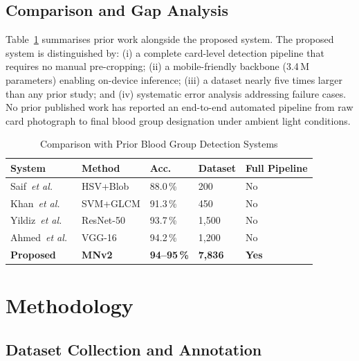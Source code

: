 \documentclass[journal]{IEEEtran}
\begin{document}
\subsection{Comparison and Gap Analysis}

Table~\ref{tab:comparison} summarises prior work alongside the
proposed system.
The proposed system is distinguished by: (i) a complete card-level
detection pipeline that requires no manual pre-cropping; (ii) a
mobile-friendly backbone (3.4\,M parameters) enabling on-device
inference; (iii) a dataset nearly five times larger than any prior
study; and (iv) systematic error analysis addressing failure cases.
No prior published work has reported an end-to-end automated pipeline
from raw card photograph to final blood group designation under
ambient light conditions.

\begin{table}[htbp]
  \caption{Comparison with Prior Blood Group Detection Systems}
  \label{tab:comparison}
  \centering
  \renewcommand{\arraystretch}{1.1}
  \begin{tabular}{lp{1.4cm}p{0.8cm}p{1.0cm}p{1.0cm}}
    \toprule
    \textbf{System} & \textbf{Method} & \textbf{Acc.} &
    \textbf{Dataset} & \textbf{Full Pipeline} \\
    \midrule
    Saif~\emph{et al.}~\cite{saif2016}    & HSV+Blob   & 88.0\,\% & 200    & No \\
    Khan~\emph{et al.}~\cite{khan2018}    & SVM+GLCM   & 91.3\,\% & 450    & No \\
    Yildiz~\emph{et al.}~\cite{yildiz2020}& ResNet-50  & 93.7\,\% & 1,500  & No \\
    Ahmed~\emph{et al.}~\cite{ahmed2021}  & VGG-16     & 94.2\,\% & 1,200  & No \\
    \textbf{Proposed}                     & \textbf{MNv2} & \textbf{94--95\,\%} & \textbf{7,836} & \textbf{Yes} \\
    \bottomrule
  \end{tabular}
\end{table}

\section{Methodology}
\label{sec:method}

\subsection{Dataset Collection and Annotation}
\end{document}
